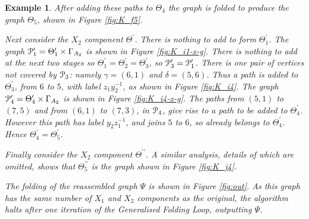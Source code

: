 \documentclass[a4paper,12pt]{article}
\newcommand{\G}{\Gamma }
\newcommand{\g}{\gamma }
\renewcommand{\d}{\delta }
\newcommand{\T}{\Theta }
\newcommand{\cP}{{\cal{P}}}
\newtheorem{exam}[theorem]{Example}
\newenvironment{example}{\begin{exam} \rm}{\end{exam}}
\numberwithin{equation}{section}
\numberwithin{figure}{section}
\begin{document}
\begin{example}
 After adding these paths to $\T_4$ the graph is folded to
produce the graph $\T_5$, shown in Figure \ref{fig:K_f5}.


Next consider the $X_2$ component $\T^\prime$. There is nothing to
add to form $\T^\prime_1$. The graph $\cP_1^\prime=\T_1^\prime
\times \G_{A_2}$ is shown in Figure \ref{fig:K_i1-x-g}. There is
nothing to add at the next two  stages so
$\T_1^\prime=\T_2^\prime=\T_3^\prime$, so
$\cP_3^\prime=\cP_1^\prime$. There is one pair of vertices not
covered by $\cP_3$: namely $\g=(6,1)$ and $\d=(5,6)$. Thus a path
is added to $\T_3^\prime$, from $6$ to $5$, with label
$z_1y_2^{-1}$, as shown in Figure \ref{fig:K_i4}. The graph
 $\cP_4^\prime=\T_4^\prime \times \G_{A_2}$ is shown in Figure \ref{fig:K_i4-x-g}. The paths
from $(5,1)$ to $(7,5)$ and from $(6,1)$ to $(7,3)$, in $\cP_4$, give rise to a path to be
added to $\T_4^\prime$. However this path has label $y_2z_1^{-1}$, and joins $5$ to $6$, so already
belongs to $\T_4^\prime$. Hence $\T_4^\prime=\T_5^\prime$.

Finally consider the $X_2$ component $\T^{\prime\prime}$. A similar analysis, details of which
are omitted, shows that $ \T^{\prime\prime}_5$ is the graph shown in Figure \ref{fig:K_j4}.

The folding of the reassembled graph $\Psi$ is shown in  Figure
\ref{fig:out}.  As this graph has the same number of $X_1$ and $X_2$ components as the original,
the algorithm halts after one iteration of the Generalised Folding Loop, outputting $\Psi$.

\end{example}
\end{document}
